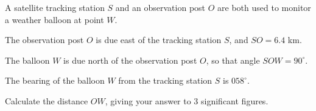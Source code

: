 \begin{question}
\noindent A satellite tracking station $S$ and an observation post $O$ are both used to monitor a weather balloon at point $W$.

\noindent The observation post $O$ is due east of the tracking station $S$, and $SO = 6.4$ km.

\noindent The balloon $W$ is due north of the observation post $O$, so that angle $SOW = 90^\circ$.

\noindent The bearing of the balloon $W$ from the tracking station $S$ is $058^\circ$.

\begin{center}
\end{center}

\noindent Calculate the distance $OW$, giving your answer to 3 significant figures.

\vspace{5.5cm}

\begin{flushright}
\end{flushright}
\end{question}
